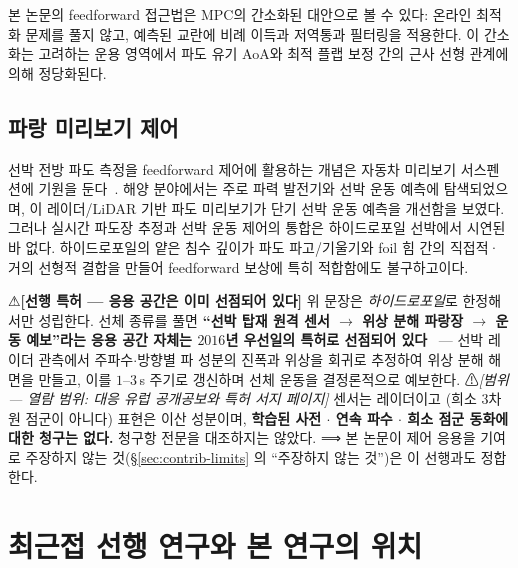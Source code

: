 \documentclass[11pt]{report}
\numberwithin{equation}{chapter}
\numberwithin{figure}{chapter}
\numberwithin{table}{chapter}
\begin{document}
본 논문의 feedforward 접근법은 MPC의 간소화된 대안으로 볼 수 있다:
온라인 최적화 문제를 풀지 않고, 예측된 교란에 비례 이득과 저역통과 필터링을
적용한다. 이 간소화는 고려하는 운용 영역에서 파도 유기 AoA와 최적 플랩 보정 간의
근사 선형 관계에 의해 정당화된다.

\subsection{파랑 미리보기 제어}
\label{sec:wave-preview-prior}

선박 전방 파도 측정을 feedforward 제어에 활용하는 개념은
자동차 미리보기 서스펜션에 기원을 둔다~\citep{Hrovat1997}.
해양 분야에서는 주로 파력 발전기와 선박 운동 예측에 탐색되었으며,
\citet{Cummins2017}이 레이더/LiDAR 기반 파도 미리보기가 단기 선박 운동
예측을 개선함을 보였다.
그러나 실시간 파도장 추정과 선박 운동 제어의 통합은
하이드로포일 선박에서 시연된 바 없다.
하이드로포일의 얕은 침수 깊이가 파도 파고/기울기와 foil 힘 간의
직접적·거의 선형적 결합을 만들어 feedforward 보상에 특히 적합함에도 불구하고이다.

⚠\textbf{[선행 특허 --- 응용 공간은 이미 선점되어 있다]} 위 문장은 \emph{하이드로포일}로
한정해서만 성립한다. 선체 종류를 풀면 \textbf{``선박 탑재 원격 센서 $\to$ 위상 분해 파랑장
$\to$ 운동 예보''라는 응용 공간 자체는 $2016$년 우선일의 특허로 선점되어
있다}~\citep{Patent10677891, Patent10684353} --- 선박 레이더 관측에서 주파수$\cdot$방향별
파 성분의 진폭과 위상을 회귀로 추정하여 위상 분해 해면을 만들고, 이를 $1$--$3$\,s 주기로
갱신하며 선체 운동을 결정론적으로 예보한다.
⚠\emph{[범위 --- 열람 범위: 대응 유럽 공개공보와 특허 서지 페이지]} 센서는 레이더이고
(희소 $3$차원 점군이 아니다) 표현은 이산 성분이며, \textbf{학습된 사전 $\cdot$ 연속 파수
$\cdot$ 희소 점군 동화에 대한 청구는 없다.} 청구항 전문을 대조하지는 않았다.
⟹ 본 논문이 제어 응용을 기여로 주장하지 않는 것(\S\ref{sec:contrib-limits} 의
``주장하지 않는 것'')은 이 선행과도 정합한다.

\section{최근접 선행 연구와 본 연구의 위치}
\label{sec:closest-prior}
\end{document}
